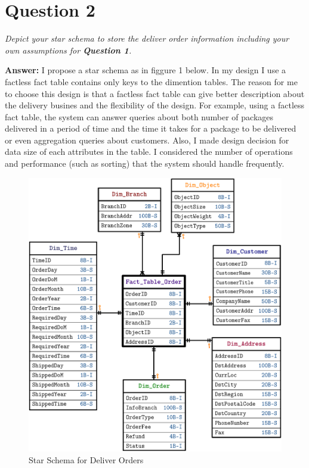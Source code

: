 \documentclass[a4paper,11pt]{article}
\begin{document}
\section*{Question 2}

\textit{Depict your star schema to store the deliver order information including your own assumptions for \textbf{Question 1}.} 

\noindent
\textbf{Answer:} I propose a star schema as in figgure 1 below. In my design I use a factless fact table contains only keys to the dimention tables. The reason for me to choose this design is that a factless fact table can give better description about the delivery busines and the flexibility of the design. For example, using a factless fact table, the system can answer queries about both number of packages delivered in a period of time and the time it takes for a package to be delivered
or even aggregation queries about customers. Also, I made design decision for data size of each attributes in the table. I considered the number of operations and performance (such as sorting) that the system should handle frequently.

\vspace{3em}

\begin{figure}[htbp]
    \centering
    \includegraphics[scale=0.75]{OrderStarSchema.pdf}
    \caption{Star Schema for Deliver Orders}
\end{figure}
\end{document}
